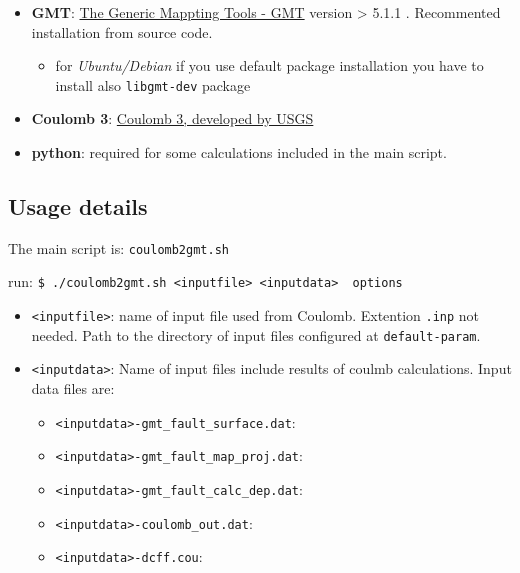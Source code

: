\begin{itemize}
\item
  \textbf{GMT}: \href{http://gmt.soest.hawaii.edu/}{The Generic Mappting
  Tools - GMT} version \textgreater{} 5.1.1 . Recommented installation
  from source code.

  \begin{itemize}
  
  \item
    for \emph{Ubuntu/Debian} if you use default package installation you
    have to install also \texttt{libgmt-dev} package
  \end{itemize}
\item
  \textbf{Coulomb 3}:
  \href{https://earthquake.usgs.gov/research/software/coulomb/}{Coulomb
  3, developed by USGS}
\item
  \textbf{python}: required for some calculations included in the main
  script.
\end{itemize}

\subsection{Usage details}\label{usage-details}

The main script is: \texttt{coulomb2gmt.sh}

run:
\texttt{\$\ ./coulomb2gmt.sh\ \textless{}inputfile\textgreater{}\ \textless{}inputdata\textgreater{}\ \textbar{}\ options}

\begin{itemize}
\item
  \texttt{\textless{}inputfile\textgreater{}}: name of input file used
  from Coulomb. Extention \texttt{.inp} not needed. Path to the
  directory of input files configured at \texttt{default-param}.
\item
  \texttt{\textless{}inputdata\textgreater{}}: Name of input files
  include results of coulmb calculations. Input data files are:

  \begin{itemize}
  
  \item
    \texttt{\textless{}inputdata\textgreater{}-gmt\_fault\_surface.dat}:
  \item
    \texttt{\textless{}inputdata\textgreater{}-gmt\_fault\_map\_proj.dat}:
  \item
    \texttt{\textless{}inputdata\textgreater{}-gmt\_fault\_calc\_dep.dat}:
  \item
    \texttt{\textless{}inputdata\textgreater{}-coulomb\_out.dat}:
  \item
    \texttt{\textless{}inputdata\textgreater{}-dcff.cou}:
  \end{itemize}
\end{itemize}

